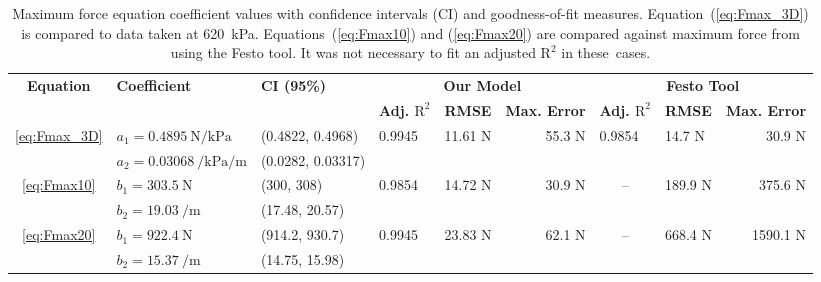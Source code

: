 \begin{table}
\centering
\begingroup
\singlespacing
\fontsize{10}{12}\selectfont
\setlength{\tabcolsep}{3pt}
\renewcommand{\arraystretch}{1.15}
\caption{Maximum force equation coefficient values with confidence intervals (CI) and goodness-of-fit measures. Equation~(\ref{eq:Fmax_3D}) is compared to data taken at \qty{620}{\kPa}. Equations~(\ref{eq:Fmax10}) and (\ref{eq:Fmax20}) are compared against maximum force from using the Festo tool. It was not necessary to fit an adjusted $\text{R}^2$ in \mbox{these cases.}} 
\label{tab:Fmax}
\begin{tabular}{@{}cllrrrrrr@{}}
\toprule
\multirow{2}{*}{\textbf{Equation}} &
  \multirow{2}{*}{\textbf{Coefficient}} &
  \multirow{2}{*}{\textbf{CI (95\%)}} &
  \multicolumn{3}{c}{\textbf{Our Model}} &
  \multicolumn{3}{c}{\textbf{Festo Tool}} \\  
 &
   &
   &
  \multicolumn{1}{l}{\textbf{Adj. $\text{R}^2$}} &
  \multicolumn{1}{l}{\textbf{RMSE}} &
  \textbf{Max. Error} &
  \multicolumn{1}{l}{\textbf{Adj. $\text{R}^2$}} &
  \multicolumn{1}{l}{\textbf{RMSE}} &
  \textbf{Max. Error} \\ \midrule 
\multirow{2}{*}{\eqref{eq:Fmax_3D}} &
  $a_1 =   \qty{0.4895}{\N\per\kPa}$ &
  (0.4822, 0.4968) &
  \multicolumn{1}{l}{\multirow{2}{*}{0.9945}} &
  \multicolumn{1}{l}{\multirow{2}{*}{11.61 N}} &
  \multirow{2}{*}{55.3 N} &
  \multicolumn{1}{l}{\multirow{2}{*}{0.9854}} &
  \multicolumn{1}{l}{\multirow{2}{*}{14.7 N}} &
  \multirow{2}{*}{30.9 N} \\ 
 &
  $a_2 =   \qty{0.03068}{\per\kPa\per\m}$ &
  (0.0282, 0.03317) &
  \multicolumn{1}{l}{} &
  \multicolumn{1}{l}{} &
   &
  \multicolumn{1}{l}{} &
  \multicolumn{1}{l}{} &
   \\ \midrule
\multirow{2}{*}{\eqref{eq:Fmax10}} &
  $b_1   =\qty{303.5}{\N}$ &
  (300, 308) &
  \multicolumn{1}{l}{\multirow{2}{*}{0.9854}} &
  \multicolumn{1}{l}{\multirow{2}{*}{14.72 N}} &
  \multirow{2}{*}{30.9 N} &
  \multicolumn{1}{c}{\multirow{2}{*}{--}} &
  \multicolumn{1}{l}{\multirow{2}{*}{189.9 N}} &
  \multirow{2}{*}{375.6 N} \\ 
 &
  $b_2 =   \qty{19.03}{\per\m}$ &
  (17.48, 20.57) &
  \multicolumn{1}{l}{} &
  \multicolumn{1}{l}{} &
   &
  \multicolumn{1}{l}{} &
  \multicolumn{1}{l}{} &
   \\ \midrule
\multirow{2}{*}{\eqref{eq:Fmax20}} &
  $b_1 =   \qty{922.4}{\N}$ &
  (914.2, 930.7) &
  \multicolumn{1}{l}{\multirow{2}{*}{0.9945}} &
  \multicolumn{1}{l}{\multirow{2}{*}{23.83 N}} &
  \multirow{2}{*}{62.1 N} &
  \multicolumn{1}{c}{\multirow{2}{*}{--}} &
  \multicolumn{1}{l}{\multirow{2}{*}{668.4 N}} &
  \multirow{2}{*}{1590.1 N} \\ 
 &
  $b_2=\qty{15.37}{\per\m}$ &
  (14.75, 15.98) &
  \multicolumn{1}{l}{} &
  \multicolumn{1}{l}{} &
   &
  \multicolumn{1}{l}{} &
  \multicolumn{1}{l}{} &
   \\ \bottomrule
\end{tabular}


\end{table}
